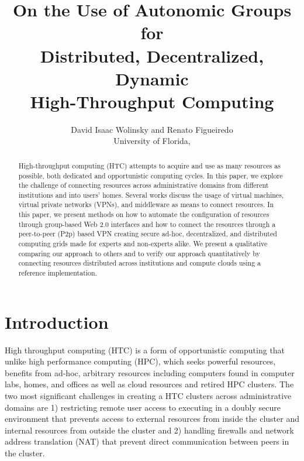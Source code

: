 \documentclass{sig-alternate}
\begin{document}
\title{On the Use of Autonomic Groups for\\
Distributed, Decentralized, Dynamic\\
High-Throughput Computing}

\author{
David Isaac Wolinsky and Renato Figueiredo
\\
University of Florida, 
\\
}

\maketitle

\begin{abstract}
High-throughput computing (HTC) attempts to acquire and use as many resources as
possible, both dedicated and opportunistic computing cycles.  In this paper, we
explore the challenge of connecting resources across administrative domains from
different institutions and into users' homes.  Several works discuss the usage
of virtual machines, virtual private networks (VPNs), and middleware as means to
connect resources.  In this paper, we present methods on how to automate the
configuration of resources through group-based Web 2.0 interfaces and how
to connect the resources through a peer-to-peer (P2p) based VPN creating
secure ad-hoc, decentralized, and distributed computing grids made for experts
and non-experts alike.  We present a qualitative comparing our approach to others
and to verify our approach quantitatively by connecting resources distributed
across institutions and compute clouds using a reference implementation.
\end{abstract}

\section{Introduction}
High throughput computing (HTC) is a form of opportunistic computing that unlike
high performance computing (HPC), which seeks powerful resources, benefits from
ad-hoc, arbitrary resources including computers found in computer labs, homes,
and offices as well as cloud resources and retired HPC clusters.  The two most
significant challenges in creating a HTC clusters across administrative domains
are 1) restricting remote user access to executing in a doubly secure
environment that prevents access to external resources from inside the cluster
and internal resources from outside the cluster and 2) handling firewalls and
network address translation (NAT) that prevent direct communication between
peers in the cluster.
\end{document}
